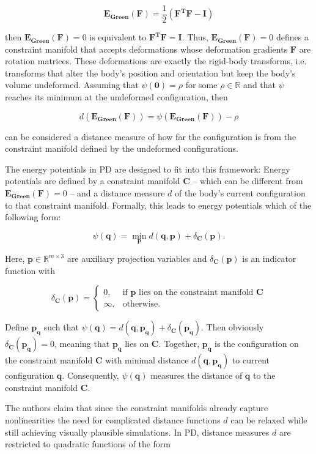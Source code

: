 \documentclass{article}
\begin{document}
\[
\bm{E_{\text{Green}}}(\bm{F}) = \frac{1}{2}(\bm{F^TF} - \bm{I})
\]

then $\bm{E_{\text{Green}}}(\bm{F}) = 0$ is equivalent to $\bm{F^TF} = \bm{I}$. Thus, $\bm{E_{\text{Green}}}(\bm{F}) = 0$ defines a constraint
manifold that accepts deformations whose deformation gradients $\bm{F}$ are rotation matrices. These deformations are exactly the rigid-body 
transforms, i.e. transforms that alter the body's position and orientation but keep the body's volume undeformed. Assuming that $\psi(\bm{0}) 
= \rho$ for some $\rho \in \mathbb{R}$ and that $\psi$ reaches its minimum at the undeformed configuration, then 

\[
    d(\bm{E_{\text{Green}}}(\bm{F})) = \psi(\bm{E_{\text{Green}}}(\bm{F})) - \rho
\]

can be considered a distance measure of how far the configuration is from the constraint manifold defined by the undeformed configurations. 

The energy potentials in PD are designed to fit into this framework: Energy potentials are defined by a constraint manifold $\bm{C}$ -- which 
can be different from $\bm{E_{\text{Green}}(\bm{F})} = 0$ -- and a distance measure $d$ of the body's current configuration to that constraint 
manifold. Formally, this leads to energy potentials which of the 
following form:

\[
    \psi({\bm{q}}) = \min_{\bm{p}} d(\bm{q}, \bm{p}) + \delta_{\bm{C}}(\bm{p}).
\]

Here, $\bm{p} \in \mathbb{R}^{m \times 3}$ are auxiliary projection variables and $\delta_{\bm{C}}(\bm{p})$ is an indicator function with 

\[
    \delta_{\bm{C}}(\bm{p})= 
\begin{cases}
0,& \text{if } \bm{p} \text{ lies on the constraint manifold } \bm{C}\\
\infty,& \text{otherwise.}
\end{cases}
\]

Define $\bm{p_{\bm{q}}}$ such that $\psi({\bm{q}}) = d(\bm{q}, \bm{p_{\bm{q}}}) + \delta_{\bm{C}}(\bm{p_{\bm{q}}})$. Then obviously 
$\delta_{\bm{C}}(\bm{p_{\bm{q}}}) = 0$, meaning that $\bm{p_{\bm{q}}}$ lies on $\bm{C}$. Together, $\bm{p_{\bm{q}}}$ is the 
configuration on the constraint manifold $\bm{C}$ with minimal distance $d(\bm{q}, \bm{p_{\bm{q}}})$ to current configuration $\bm{q}$.
Consequently, $\psi(\bm{q})$ measures the distance of $\bm{q}$ to the constraint manifold $\bm{C}$.

The authors claim that since the constraint manifolds already capture nonlinearities the need for complicated distance functions $d$
can be relaxed while still achieving visually plausible simulations. In PD, distance measures $d$ are restricted to quadratic functions 
of the form
\end{document}
